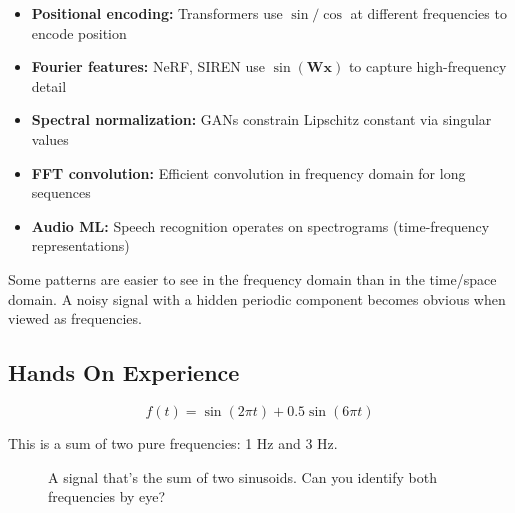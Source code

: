 \begin{itemize}
    \item \textbf{Positional encoding:} Transformers use $\sin/\cos$ at different frequencies to encode position
    \item \textbf{Fourier features:} NeRF, SIREN use $\sin(\mathbf{W}\mathbf{x})$ to capture high-frequency detail
    \item \textbf{Spectral normalization:} GANs constrain Lipschitz constant via singular values
    \item \textbf{FFT convolution:} Efficient convolution in frequency domain for long sequences
    \item \textbf{Audio ML:} Speech recognition operates on spectrograms (time-frequency representations)
\end{itemize}

 Some patterns are easier to see in the frequency domain than in the time/space domain.
A noisy signal with a hidden periodic component becomes obvious when viewed as frequencies.



\newpage
\subsection{Hands On Experience}

\begin{equation}
    f(t) = \sin(2\pi t) + 0.5\sin(6\pi t)
\end{equation}

This is a sum of two pure frequencies: 1 Hz and 3 Hz.

\begin{figure}[h]
    \centering
    \caption{A signal that's the sum of two sinusoids. Can you identify both frequencies by eye?}
    \label{fig:composite_signal}
\end{figure}

